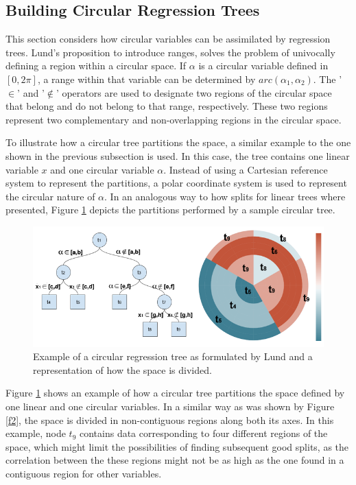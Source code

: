 \documentclass[times,twocolumn,final,authoryear]{elsarticle}
\begin{document}
\subsection{Building Circular Regression Trees}

This section considers how circular variables can be assimilated by regression trees. Lund's proposition to introduce ranges, solves the problem of univocally defining a region within a circular space. If $\alpha$ is a circular variable defined in $[0, 2\pi]$, a range within that variable can be determined by $arc(\alpha_1, \alpha_2)$. The '$\in$' and '$\notin$' operators are used to designate two regions of the circular space that belong and do not belong to that range, respectively. These two regions represent two complementary and non-overlapping regions in the circular space.

To illustrate how a circular tree partitions the space, a similar example to the one shown in the previous subsection is used. In this case, the tree contains one linear variable $x$ and one circular variable $\alpha$. Instead of using a Cartesian reference system to represent the partitions, a polar coordinate system is used to represent the circular nature of $\alpha$. In an analogous way to how splits for linear trees where presented, Figure \ref{f3} depicts the partitions performed by a sample circular tree.

%
\begin{figure}
  \includegraphics[width=17cm]{fig3_master.png}
\caption{Example of a circular regression tree as formulated by Lund and a representation of how the space is divided.}
\label{f3}       %
\end{figure}
%


Figure \ref{f3} shows an example of how a circular tree partitions the space defined by one linear and one circular variables. In a similar way as was shown by Figure \ref{f2}, the space is divided in non-contiguous regions along both its axes. In this example, node $t_9$ contains data corresponding to four different regions of the space, which might limit the possibilities of finding subsequent good splits, as the correlation between the these regions might not be as high as the one found in a contiguous region for other variables. 
\end{document}
